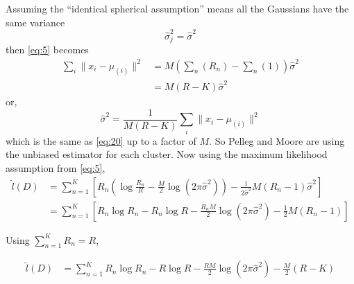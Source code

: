 \documentclass[letterpaper]{article}
\begin{document}
Assuming the ``identical spherical assumption'' means all the
Gaussians have the same variance
\begin{equation}
  \label{eq:6}
  \hat{\sigma}_j^2 = \hat{\sigma}^2
\end{equation}
then \eqref{eq:5} becomes
\begin{align}
  \nonumber
  \sum_i \|x_i - \mu_{(i)}\|^2 &= M \left(\sum_n \left(R_n\right) - \sum_n\left( 1 \right)\right) \hat\sigma^2 \\
  \label{eq:7}
             &= M \left( R - K \right) \hat{\sigma}^2
\end{align}
or, 
\begin{equation}
  \label{eq:8}
  \hat{\sigma}^2 = \frac{1}{M(R-K)}\sum_{i} \| x_i - \mu_{(i)} \|^2
\end{equation}
which is the same as \eqref{eq:20} up to a factor of $M$.  So Pelleg
and Moore are using the unbiased estimator for each cluster.  Now
using the maximum likelihood assumption from \eqref{eq:5},
%
\begin{align}
  \label{eq:14}
  \hat{l}(D) &= \sum_{n=1}^K
                   \left[ R_n \left( \log \frac{R_n}{R}
                          - \frac{M}{2} \log \left(2 \pi \hat{\sigma}^2 \right) \right)
                   - \frac{1}{2\hat{\sigma}^2} M \left( R_n - 1 \right) \hat{\sigma}^2 \right] \\
             &= \sum_{n=1}^K \left[ R_n \log R_n - R_n \log R - \frac{R_nM}{2} \log \left(2 \pi \hat{\sigma}^2 \right)
                   - \frac{1}{2} M \left( R_n - 1 \right)\right]
\end{align}

Using $\sum_{n=1}^K R_n = R$,

\begin{align}
  \label{eq:15}
  \hat{l}(D) &= \sum_{n=1}^K R_n \log R_n - R \log R - \frac{RM}{2} \log \left(2 \pi \hat{\sigma}^2 \right)
                   - \frac{M}{2} \left( R - K \right)
\end{align}
\end{document}
